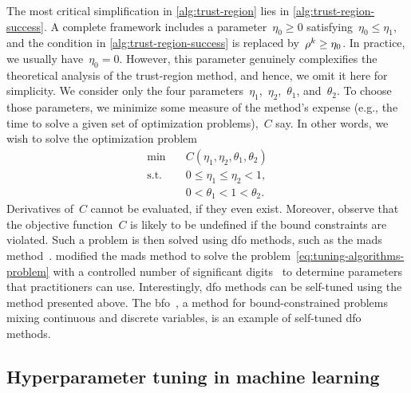 The most critical simplification in \cref{alg:trust-region} lies in \cref{alg:trust-region-success}.
A complete framework includes a parameter~$\eta_0 \ge 0$ satisfying~$\eta_0 \le \eta_1$, and the condition in \cref{alg:trust-region-success} is replaced by~$\ratio[k] \ge \eta_0$.
In practice, we usually have~$\eta_0 = 0$.
However, this parameter genuinely complexifies the theoretical analysis of the trust-region method, and hence, we omit it here for simplicity.
We consider only the four parameters~$\eta_1$,~$\eta_2$,~$\theta_1$, and~$\theta_2$.
To choose those parameters, we minimize some measure of the method's expense (e.g., the  time to solve a given set of optimization problems),~$C$ say.
In other words, we wish to solve the optimization problem
\begin{subequations}
    \label{eq:tuning-algorithms-problem}
    \begin{align}
        \min        & \quad C(\eta_1, \eta_2, \theta_1, \theta_2)\\
        \text{s.t.} & \quad 0 \le \eta_1 \le \eta_2 < 1,\\
                    & \quad 0 < \theta_1 < 1 < \theta_2.
    \end{align}
\end{subequations}
Derivatives of~$C$ cannot be evaluated, if they even exist.
Moreover, observe that the objective function~$C$ is likely to be undefined if the bound constraints are violated.
Such a problem is then solved using \gls{dfo} methods, such as the \gls{mads} method~\cite{Audet_Orban_2006}.
 modified the \gls{mads} method to solve the problem~\cref{eq:tuning-algorithms-problem} with a controlled number of significant digits~\cite{Audet_Digabel_Tribes_2019} to determine parameters that practitioners can use.
Interestingly, \gls{dfo} methods can be self-tuned using the method presented above.
The \gls{bfo}~\cite{Porcelli_Toint_2017}, a method for bound-constrained problems mixing continuous and discrete variables, is an example of self-tuned \gls{dfo} methods.

\subsection{Hyperparameter tuning in machine learning}
\label{subsec:machine-learning}

